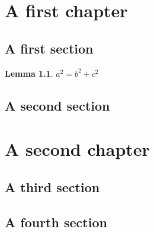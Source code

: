 \documentclass{report}
\theoremstyle{plain}
\newtheorem{lemma}[subsection]{Lemma}
\theoremstyle{definition}
\theoremstyle{remark}
\numberwithin{equation}{subsection}
\begin{document}
\chapter{A first chapter}
\label{chapter:first}

\section{A first section}
\label{section:first}

\begin{lemma}
  \label{lemma:pythagoras}
  $a^2=b^2+c^2$
\end{lemma}



\section{A second section}
\label{section:second}


\chapter{A second chapter}
\label{chapter:second}

\section{A third section}
\label{section:third}

\section{A fourth section}
\label{section:fourth}
\end{document}
